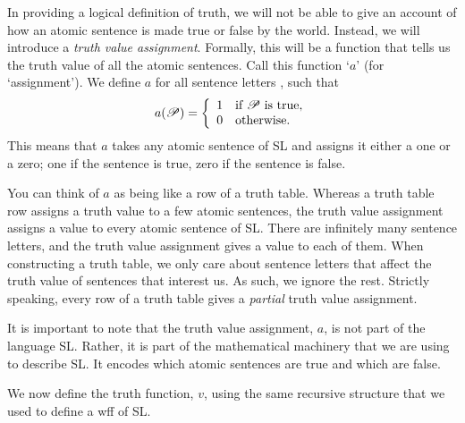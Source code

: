 In providing a logical definition of truth, we will not be able to give an account of how an atomic sentence is made true or false by the world. Instead, we will introduce a \emph{truth value assignment}. Formally, this will be a function that tells us the truth value of all the atomic sentences. Call this function `$a$' (for `assignment'). We define $a$ for all sentence letters , such that
\begin{displaymath}
a(\mathscr{P}) =
\left\{
	\begin{array}{ll}
	1 & \mbox{if \ensuremath{\mathscr{P}} is true},\\
	0 & \mbox{otherwise.}
	\end{array}
\right.
\end{displaymath}
This means that $a$ takes any atomic sentence of SL and assigns it either a one or a zero; one if the sentence is true, zero if the sentence is false. 

You can think of $a$ as being like a row of a truth table. Whereas a truth table row assigns a truth value to a few atomic sentences, the truth value assignment assigns a value to every atomic sentence of SL. There are infinitely many sentence letters, and the truth value assignment gives a value to each of them. When constructing a truth table, we only care about sentence letters that affect the truth value of sentences that interest us. As such, we ignore the rest. Strictly speaking, every row of a truth table gives a \emph{partial} truth value assignment.

It is important to note that the truth value assignment, $a$, is not part of the language SL. Rather, it is part of the mathematical machinery that we are using to describe SL. It encodes which atomic sentences are true and which are false.


We now define the truth function, $v$, using the same recursive structure that we used to define a wff of SL.

